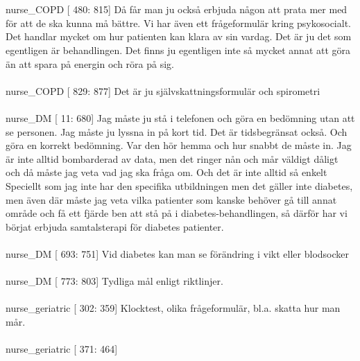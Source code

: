 \documentclass[12pt,a4paper,oneside]{article}
\begin{document}
\\\ \\
 nurse\_COPD [ 480: 815] 
D{\aa} f{\aa}r man ju ocks{\aa} erbjuda n{\aa}gon att prata mer med f{\"o}r att de ska kunna m{\aa} b{\"a}ttre. Vi har {\"a}ven ett fr{\aa}geformul{\"a}r kring psykosocialt. Det handlar mycket om hur patienten kan klara av sin vardag. Det {\"a}r ju det som egentligen {\"a}r behandlingen. Det finns ju egentligen inte s{\aa} mycket annat att g{\"o}ra {\"a}n att spara p{\aa} energin och r{\"o}ra p{\aa} sig. %
\\\ \\
 nurse\_COPD [ 829: 877] 
Det {\"a}r ju sj{\"a}lvskattningsformul{\"a}r och spirometri %
\\\ \\
 nurse\_DM [  11: 680] 
Jag m{\aa}ste ju st{\aa} i telefonen och g{\"o}ra en bed{\"o}mning utan att se personen. Jag m{\aa}ste ju lyssna in p{\aa} kort tid. Det {\"a}r tidsbegr{\"a}nsat ocks{\aa}. Och g{\"o}ra en korrekt bed{\"o}mning. Var den h{\"o}r hemma och hur snabbt de m{\aa}ste in. Jag {\"a}r inte alltid bombarderad av data, men det ringer n{\aa}n och m{\aa}r v{\"a}ldigt d{\aa}ligt och d{\aa} m{\aa}ste jag veta vad jag ska fr{\aa}ga om. Och det {\"a}r inte alltid s{\aa} enkelt Speciellt som jag inte har den specifika utbildningen men det g{\"a}ller inte diabetes, men {\"a}ven d{\"a}r m{\aa}ste jag veta vilka patienter som kanske beh{\"o}ver g{\aa} till annat omr{\aa}de och f{\aa} ett fj{\"a}rde ben att st{\aa} p{\aa} i diabetes-behandlingen, s{\aa} d{\"a}rf{\"o}r har vi b{\"o}rjat erbjuda samtalsterapi f{\"o}r diabetes patienter. %
\\\ \\
 nurse\_DM [ 693: 751] 
Vid diabetes kan man se f{\"o}r{\"a}ndring i vikt eller blodsocker %
\\\ \\
 nurse\_DM [ 773: 803] 
Tydliga m{\aa}l enligt riktlinjer. %
\\\ \\
 nurse\_geriatric [ 302: 359] 
Klocktest, olika fr{\aa}geformul{\"a}r, bl.a. skatta hur man m{\aa}r. %
\\\ \\
 nurse\_geriatric [ 371: 464] 
\end{document}
